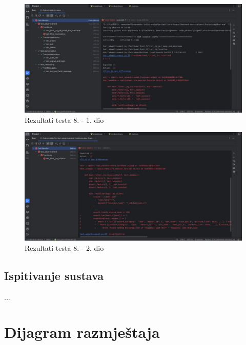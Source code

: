 			\begin{figure}[H]
			 	\includegraphics[scale=0.42]{slike/test8a.jpg} %
			 	\centering
			 	\caption{Rezultati testa 8. - 1. dio}
			 	\label{fig:test8a}
			 \end{figure}

			\begin{figure}[H]
			 	\includegraphics[scale=0.42]{slike/test8b.jpg} %
			 	\centering
			 	\caption{Rezultati testa 8. - 2. dio}
			 	\label{fig:test8b}
			 \end{figure}
			
			\subsection{Ispitivanje sustava}
			
			...
			 
			
			\eject 
		
		
		\section{Dijagram razmještaja}
			
